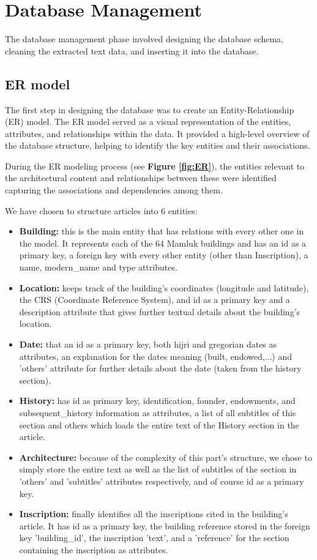 \section{Database Management}
The database management phase involved designing the database schema, cleaning the extracted text data, and inserting it into the database. 

\subsection{ER model}
The first step in designing the database was to create an Entity-Relationship (ER) model. The ER model served as a visual representation of the entities, attributes, and relationships within the data. 
It provided a high-level overview of the database structure, helping to identify the key entities and their associations.

During the ER modeling process (see \textbf{Figure \ref{fig:ER}}), the entities relevant to the architectural content and relationships between these were identified capturing the associations and dependencies among them.

We have chosen to structure articles into 6 entities:
\begin{itemize}
    \item \textbf{Building:} this is the main entity that has relations with every other one in the model. It represents each of the 64 Mamluk buildings and has an id as a primary key, a foreign key with every other entity (other than Inscription), a name, modern\_name and type attributes.
    \item \textbf{Location:} keeps track of the building's coordinates (longitude and latitude), the CRS (Coordinate Reference System), and id as a primary key and a description attribute that gives further textual details about the building's location.
    \item \textbf{Date:} that an id as a primary key, both hijri and gregorian dates as attributes, an explanation for the dates meaning (built, endowed,...) and 'others' attribute for further details about the date (taken from the history section).
    \item \textbf{History:} has id as primary key, identification, founder, endowments, and subsequent\_history information as attributes, a list of all subtitles of this section and others which loads the entire text of the History section in the article.
    \item \textbf{Architecture:} because of the complexity of this part's structure, we chose to simply store the entire text as well as the list of subtitles of the section in 'others' and 'subtitles' attributes respectively, and of course id as a primary key.
    \item \textbf{Inscription:} finally identifies all the inscriptions cited in the building's article. It has id as a primary key, the building reference stored in the foreign key 'building\_id', the inscription 'text', and a 'reference' for the section containing the inscription as attributes. \\[0.3cm]
\end{itemize}

